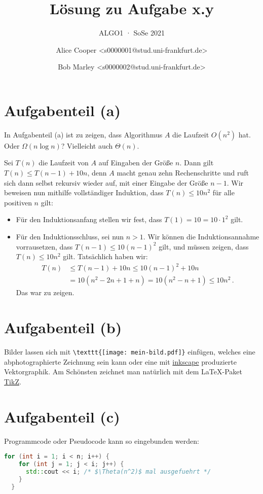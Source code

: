 \documentclass[a4paper,11pt,oneside]{scrartcl}
\subtitle{ALGO1 · SoSe 2021}
\title{Lösung zu Aufgabe x.y}
\author{%
  Alice Cooper <s0000001@stud.uni-frankfurt.de>%
  \and Bob Marley <s0000002@stud.uni-frankfurt.de>%
}
\begin{document}
\maketitle

\section{Aufgabenteil (a)}%

In Aufgabenteil (a) ist zu zeigen, dass Algorithmus $A$ die Laufzeit $O(n^2)$ hat. Oder $\Omega(n\log n)$? Vielleicht auch $\Theta(n)$.

Sei $T(n)$ die Laufzeit von $A$ auf Eingaben der Größe $n$.
Dann gilt $T(n)\le T(n-1) + 10n$, denn $A$ macht genau zehn Rechenschritte und ruft sich dann selbst rekursiv wieder auf, mit einer Eingabe der Größe $n-1$. Wir beweisen nun mithilfe vollständiger Induktion, dass $T(n)\le 10n^2$ für alle positiven $n$ gilt:

\begin{itemize}
  \item Für den Induktionsanfang stellen wir fest, dass $T(1)=10=10 \cdot 1^2$ gilt.
  \item Für den Induktionsschluss, sei nun $n>1$. Wir können die Induktionsannahme vorrausetzen, dass $T(n-1)\le 10 (n-1)^2$ gilt, und müssen zeigen, dass $T(n)\le 10n^2$ gilt. Tatsächlich haben wir:
  \begin{align*}
    T(n) &\le T(n-1)+10n
    \le 10(n-1)^2 + 10n\\
    &= 10 (n^2-2n+1+n)
    = 10 (n^2-n+1) \le 10 n^2\,.
  \end{align*}
  Das war zu zeigen.
\end{itemize}

\section{Aufgabenteil (b)}

Bilder lassen sich mit \verb|\texttt{[image: mein-bild.pdf]}| einfügen, welches eine abphotographierte Zeichnung sein kann oder eine mit \href{https://inkscape.org/}{inkscape} produzierte Vektorgraphik. Am Schönsten zeichnet man natürlich mit dem LaTeX-Paket \href{https://www.overleaf.com/learn/latex/TikZ_package/}{TikZ}.

\section{Aufgabenteil (c)}

Programmcode oder Pseudocode kann so eingebunden werden:
\begin{lstlisting}[language=C++]
  for (int i = 1; i < n; i++) {
    for (int j = 1; j < i; j++) {
      std::cout << i; /* $\Theta(n^2)$ mal ausgefuehrt */
    }
  }
\end{lstlisting}
\end{document}
